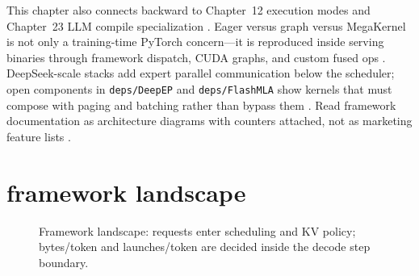 This chapter also connects backward to Chapter~12 execution modes and Chapter~23 LLM compile specialization \citep{chen2020compilerbasedhardw,yirage2026,patel2025llminference,kwon2023vllm,taxbreak2026,memoryfloor2026,liu2024deepseekv3,dao2022flashattention,dlbook}. Eager versus graph versus MegaKernel is not only a training-time PyTorch concern---it is reproduced inside serving binaries through framework dispatch, CUDA graphs, and custom fused ops \citep{nvidia2024cudagraphs,memoryfloor2026,taxbreak2026,yirage2026,chen2020compilerbasedhardw,patel2025llminference,kwon2023vllm,dlbook}. DeepSeek-scale stacks add expert parallel communication below the scheduler; open components in \texttt{deps/DeepEP} and \texttt{deps/FlashMLA} show kernels that must compose with paging and batching rather than bypass them \citep{liu2024deepseekv3,yirage2026,chen2020compilerbasedhardw,patel2025llminference,kwon2023vllm,taxbreak2026,memoryfloor2026,dlbook}. Read framework documentation as architecture diagrams with counters attached, not as marketing feature lists \citep{patel2025llminference,taxbreak2026,memoryfloor2026,yirage2026,chen2020compilerbasedhardw,kwon2023vllm,dlbook}.

\section{framework landscape}
\label{sec:ch28_framework_landscape}


\begin{figure}[t]
\centering
{}
\caption{Framework landscape: requests enter scheduling and KV policy; bytes/token and launches/token are decided inside the decode step boundary.}
\label{fig:framework_landscape_pipeline}
\end{figure}


